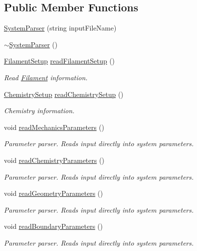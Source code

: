 \subsection*{Public Member Functions}
\begin{DoxyCompactItemize}
\item 
\hyperlink{classSystemParser_a47fe3046a8f228b77f06e84c56cccb39}{System\+Parser} (string input\+File\+Name)
\item 
\hyperlink{classSystemParser_a4603ce762d5b206694d97bb6c38f83ea}{$\sim$\+System\+Parser} ()
\item 
\hyperlink{structFilamentSetup}{Filament\+Setup} \hyperlink{classSystemParser_a2dac7ad3e016ee4ce9b93660c5192b2b}{read\+Filament\+Setup} ()
\begin{DoxyCompactList}\small\item\em Read \hyperlink{classFilament}{Filament} information. \end{DoxyCompactList}\item 
\hyperlink{structChemistrySetup}{Chemistry\+Setup} \hyperlink{classSystemParser_a8d3ff2c2163a7d141e751530c29181c8}{read\+Chemistry\+Setup} ()
\begin{DoxyCompactList}\small\item\em Chemistry information. \end{DoxyCompactList}\end{DoxyCompactItemize}
{\bf }\par
\begin{DoxyCompactItemize}
\item 
void \hyperlink{classSystemParser_a746e657d409e3dd3b40b08558a072932}{read\+Mechanics\+Parameters} ()
\begin{DoxyCompactList}\small\item\em Parameter parser. Reads input directly into system parameters. \end{DoxyCompactList}\item 
void \hyperlink{classSystemParser_a9170d246867cd58d69121ca6907baaf5}{read\+Chemistry\+Parameters} ()
\begin{DoxyCompactList}\small\item\em Parameter parser. Reads input directly into system parameters. \end{DoxyCompactList}\item 
void \hyperlink{classSystemParser_add4252ac4e2c4f2864a02ee13c45ad46}{read\+Geometry\+Parameters} ()
\begin{DoxyCompactList}\small\item\em Parameter parser. Reads input directly into system parameters. \end{DoxyCompactList}\item 
void \hyperlink{classSystemParser_a2a198730cbe281f0db40e1ddb529e878}{read\+Boundary\+Parameters} ()
\begin{DoxyCompactList}\small\item\em Parameter parser. Reads input directly into system parameters. \end{DoxyCompactList}\end{DoxyCompactItemize}

